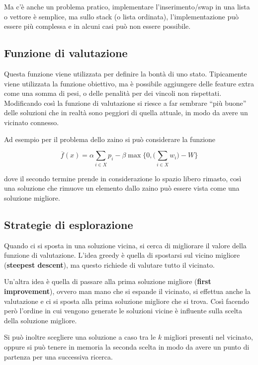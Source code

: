 Ma c'è anche un problema pratico, implementare l'inserimento/swap in una lista o vettore è semplice, ma sullo stack (o lista ordinata), l'implementazione può essere più complessa e in alcuni casi può non essere possibile.

\subsection{Funzione di valutazione}

Questa funzione viene utilizzata per definire la bontà di uno stato. 
Tipicamente viene utilizzata la funzione obiettivo, ma è possibile aggiungere delle feature extra come una somma di pesi, o delle penalità per dei vincoli non rispettati.
Modificando così la funzione di valutazione si riesce a far sembrare ``più buone'' delle soluzioni che in realtà sono peggiori di quella attuale, in modo da avere un vicinato connesso.

Ad esempio per il problema dello zaino si può considerare la funzione

$$
\overline{f}(x) = \alpha \sum_{i \in X} p_i - \beta\max\{0, \big(\sum_{i\in X} w_i\big)-W\}
$$

\noindent dove il secondo termine prende in considerazione lo spazio libero rimasto, così una soluzione che rimuove un elemento dallo zaino può essere vista come una soluzione migliore.

\subsection{Strategie di esplorazione}

Quando ci si sposta in una soluzione vicina, si cerca di migliorare il valore della funzione di valutazione.
L'idea greedy è quella di spostarsi sul vicino migliore (\textbf{steepest descent}), ma questo richiede di valutare tutto il vicinato.

Un'altra idea è quella di passare alla prima soluzione migliore (\textbf{first improvement}), ovvero man mano che si espande il vicinato, si effettua anche la valutazione e ci si sposta alla prima soluzione migliore che si trova. Così facendo però l'ordine in cui vengono generate le soluzioni vicine è influente sulla scelta della soluzione migliore.

Si può inoltre scegliere una soluzione a caso tra le $k$ migliori presenti nel vicinato, oppure si può tenere in memoria la seconda scelta in modo da avere un punto di partenza per una successiva ricerca.

